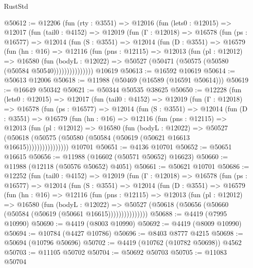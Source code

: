 \begin{lexlean}{RustStd}
\begin{coremodule}
@50612 := @12206
    (fun (rty : @3551) =>
    @12016
      (fun (lets0 : @12015) =>
      @12017
        (fun (tail0 : @4152) =>
        @12019
          (fun (Γ : @12018) =>
          @16578
            (fun (ps : @16577) =>
            @12014
              (fun (S : @3551) =>
              @12014
                (fun (D : @3551) =>
                @16579
                  (fun (hn : @16) =>
                  @12116
                    (fun (pns : @12115) =>
                    @12013
                      (fun (pl : @12012) =>
                      @16580
                        (fun (bodyL : @12022) =>
                        @50527 (@50471 (@50575 (@50580 (@50584 @50540)))))))))))))))
    @10619
@50613 := @16592 @10619
@50614 := @50613 @12006
@50618 := @11988 (@50469 (@16589 (@16591 @50614)))
@50619 := @16649 @50342
@50621 := @50344 @50535 @38625
@50650 := @12228
    (fun (lets0 : @12015) =>
    @12017
      (fun (tail0 : @4152) =>
      @12019
        (fun (Γ : @12018) =>
        @16578
          (fun (ps : @16577) =>
          @12014
            (fun (S : @3551) =>
            @12014
              (fun (D : @3551) =>
              @16579
                (fun (hn : @16) =>
                @12116
                  (fun (pns : @12115) =>
                  @12013
                    (fun (pl : @12012) =>
                    @16580
                      (fun (bodyL : @12022) =>
                      @50527
                        (@50618
                          (@50575 (@50580 (@50584 (@50619 (@50621 @16613 @16615))))))))))))))))
    @10701
@50651 := @4136 @10701
@50652 := @50651 @16615
@50656 := @11988 (@16602 (@50571 @50652) @16623)
@50660 := @11988 (@12118 (@50576 @50652) @4051)
@50661 := @50621 @10701
@50686 := @12252
    (fun (tail0 : @4152) =>
    @12019
      (fun (Γ : @12018) =>
      @16578
        (fun (ps : @16577) =>
        @12014
          (fun (S : @3551) =>
          @12014
            (fun (D : @3551) =>
            @16579
              (fun (hn : @16) =>
              @12116
                (fun (pns : @12115) =>
                @12013
                  (fun (pl : @12012) =>
                  @16580
                    (fun (bodyL : @12022) =>
                    @50527 (@50618 (@50656 (@50660 (@50584 (@50619 (@50661 @16615)))))))))))))))
@50688 := @4419 (@7995 @10990)
@50690 := @4419 (@8003 @10990)
@50692 := @4419 (@8009 @10990)
@50694 := @10784 (@4427 @10786)
@50696 := @8403 @8777 @4215
@50698 := @50694 (@10796 @50696)
@50702 := @4419 (@10762 (@10782 @50698)) @4562
@50703 := @11105 @50702
@50704 := @50692 @50703
@50705 := @11083 @50704

\end{coremodule}
\end{lexlean}
